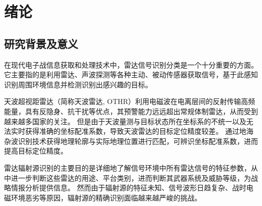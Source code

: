 
\chapter{绪论}
\label{sec:intro}
\section{研究背景及意义}








在现代电子战信息获取和处理技术中，雷达信号识别分类是一个十分重要的方面。它主要指的是利用雷达、声波探测等各种主动、被动传感器获取信号，基于此感知识别周围环境信息并检测识别出感兴趣的目标。

天波超视距雷达（简称天波雷达, OTHR）利用电磁波在电离层间的反射传输高频能量，具有反隐身、抗干扰等优点，其预警能力远远超出常规体制雷达，从而受到越来越多国家的关注。
但是由于天波量测与目标状态所在坐标系的不统一以及无法实时获得准确的坐标配准系数，导致天波雷达的目标定位精度较差。
通过地海杂波识别技术获得地理轮廓与实际地理位置进行匹配，可辨识坐标配准系数，进而提高目标定位精度。

雷达辐射源识别的主要目的是详细地了解信号环境中所有雷达信号的特征参数，从中进一步判断这些雷达的用途、平台类别，进而判断其武器系统及威胁等级，为战略情报分析提供信息。
然而由于辐射源的特征未知、信号波形日趋复杂、战时电磁环境恶劣等原因，辐射源的精确识别面临越来越严峻的挑战。

